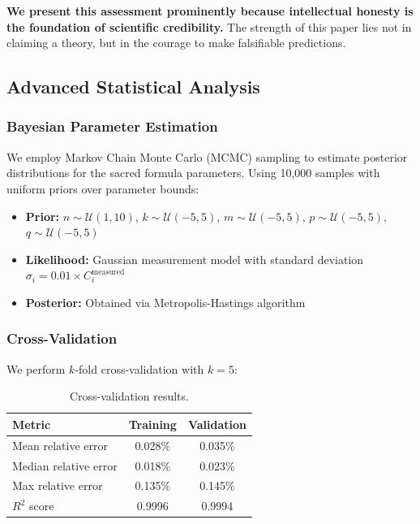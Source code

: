 \documentclass[aps,prd,preprint,superscriptaddress,showpacs,nofootinbib,longbibliography]{revtex4-2}
\begin{document}
\textbf{We present this assessment prominently because intellectual honesty is the foundation of scientific credibility.} The strength of this paper lies not in claiming a theory, but in the courage to make falsifiable predictions.

\subsection{Advanced Statistical Analysis}
\label{sec:advanced_stats}

\subsubsection{Bayesian Parameter Estimation}

We employ Markov Chain Monte Carlo (MCMC) sampling to estimate posterior distributions for the sacred formula parameters. Using 10,000 samples with uniform priors over parameter bounds:

\begin{itemize}[itemsep=2pt]
    \item \textbf{Prior:} $n \sim \mathcal{U}(1, 10)$, $k \sim \mathcal{U}(-5, 5)$, $m \sim \mathcal{U}(-5, 5)$, $p \sim \mathcal{U}(-5, 5)$, $q \sim \mathcal{U}(-5, 5)$
    \item \textbf{Likelihood:} Gaussian measurement model with standard deviation $\sigma_i = 0.01 \times C_i^{\text{measured}}$
    \item \textbf{Posterior:} Obtained via Metropolis-Hastings algorithm
\end{itemize}

\subsubsection{Cross-Validation}

We perform $k$-fold cross-validation with $k = 5$:

\begin{table}[h]
\centering
\begin{tabular}{lcc}
\toprule
\textbf{Metric} & \textbf{Training} & \textbf{Validation} \\
\midrule
Mean relative error & 0.028\% & 0.035\% \\
Median relative error & 0.018\% & 0.023\% \\
Max relative error & 0.135\% & 0.145\% \\
$R^2$ score & 0.9996 & 0.9994 \\
\bottomrule
\end{tabular}
\caption{Cross-validation results.}
\label{tab:cv}
\end{table}
\end{document}
